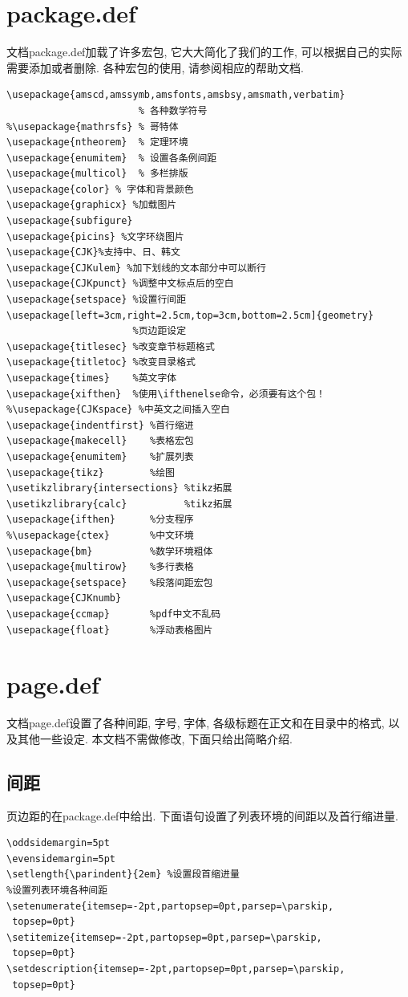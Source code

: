 \documentclass[a4paper,12pt,twoside]{ctexart}
\begin{document}
\section{package.def}
    文档package.def加载了许多宏包, 它大大简化了我们的工作, 可以根据自己的实际需要添加或者删除. 各种宏包的使用, 请参阅相应的帮助文档.
    \begin{verbatim}
\usepackage{amscd,amssymb,amsfonts,amsbsy,amsmath,verbatim}
                       % 各种数学符号
%\usepackage{mathrsfs} % 哥特体
\usepackage{ntheorem}  % 定理环境
\usepackage{enumitem}  % 设置各条例间距
\usepackage{multicol}  % 多栏排版
\usepackage{color} % 字体和背景颜色
\usepackage{graphicx} %加载图片
\usepackage{subfigure}
\usepackage{picins} %文字环绕图片
\usepackage{CJK}%支持中、日、韩文
\usepackage{CJKulem} %加下划线的文本部分中可以断行
\usepackage{CJKpunct} %调整中文标点后的空白
\usepackage{setspace} %设置行间距
\usepackage[left=3cm,right=2.5cm,top=3cm,bottom=2.5cm]{geometry}
                      %页边距设定
\usepackage{titlesec} %改变章节标题格式
\usepackage{titletoc} %改变目录格式
\usepackage{times}    %英文字体
\usepackage{xifthen}  %使用\ifthenelse命令，必须要有这个包！
%\usepackage{CJKspace} %中英文之间插入空白
\usepackage{indentfirst} %首行缩进
\usepackage{makecell}    %表格宏包
\usepackage{enumitem}    %扩展列表
\usepackage{tikz}        %绘图
\usetikzlibrary{intersections} %tikz拓展
\usetikzlibrary{calc}          %tikz拓展
\usepackage{ifthen}      %分支程序
%\usepackage{ctex}       %中文环境
\usepackage{bm}          %数学环境粗体
\usepackage{multirow}    %多行表格
\usepackage{setspace}    %段落间距宏包
\usepackage{CJKnumb}
\usepackage{ccmap}       %pdf中文不乱码
\usepackage{float}       %浮动表格图片
\end{verbatim}

\section{page.def}
    文档page.def设置了各种间距, 字号, 字体, 各级标题在正文和在目录中的格式, 以及其他一些设定. 本文档不需做修改, 下面只给出简略介绍.
    \subsection{间距}
    页边距的在package.def中给出. 下面语句设置了列表环境的间距以及首行缩进量.
\begin{verbatim}
\oddsidemargin=5pt
\evensidemargin=5pt
\setlength{\parindent}{2em} %设置段首缩进量
%设置列表环境各种间距
\setenumerate{itemsep=-2pt,partopsep=0pt,parsep=\parskip,
 topsep=0pt}
\setitemize{itemsep=-2pt,partopsep=0pt,parsep=\parskip,
 topsep=0pt}
\setdescription{itemsep=-2pt,partopsep=0pt,parsep=\parskip,
 topsep=0pt}
\end{verbatim}\vspace*{-0pt}
\end{document}

